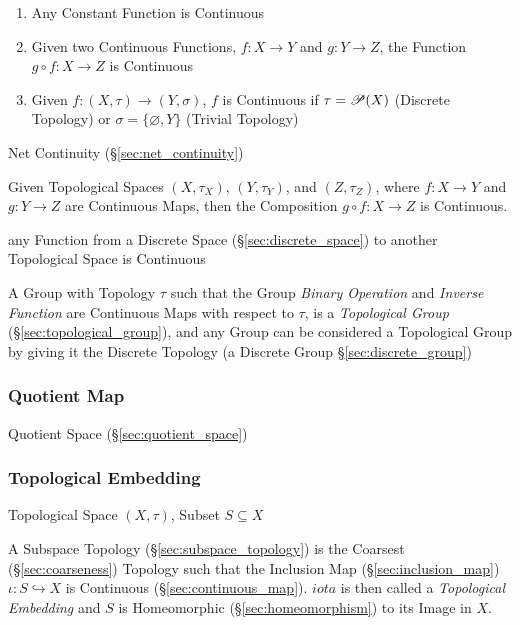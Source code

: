 \begin{enumerate}
  \item Any Constant Function is Continuous
  \item Given two Continuous Functions, $f : X \rightarrow Y$ and $g
    : Y \rightarrow Z$, the Function $g \circ f : X \rightarrow Z$ is
    Continuous
  \item Given $f : (X, \tau) \rightarrow (Y, \sigma)$, $f$ is
    Continuous if $\tau = \mathscr{P}(X)$ (Discrete Topology) or
    $\sigma = \{\varnothing, Y\}$ (Trivial Topology)
\end{enumerate}

Net Continuity (\S\ref{sec:net_continuity})

Given Topological Spaces $(X, \tau_X)$, $(Y, \tau_Y)$, and $(Z,
\tau_Z)$, where $f: X \rightarrow Y$ and $g: Y \rightarrow Z$ are
Continuous Maps, then the Composition $g \circ f : X \rightarrow Z$ is
Continuous.

any Function from a Discrete Space (\S\ref{sec:discrete_space}) to another
Topological Space is Continuous

A Group with Topology $\tau$ such that the Group \emph{Binary Operation} and
\emph{Inverse Function} are Continuous Maps with respect to $\tau$, is a
\emph{Topological Group} (\S\ref{sec:topological_group}), and any Group can be
considered a Topological Group by giving it the Discrete Topology (a Discrete
Group \S\ref{sec:discrete_group})



\subsubsection{Quotient Map}\label{sec:quotient_map}

Quotient Space (\S\ref{sec:quotient_space})



\subsubsection{Topological Embedding}\label{sec:topological_embedding}

Topological Space $(X,\tau)$, Subset $S \subseteq X$

A Subspace Topology (\S\ref{sec:subspace_topology}) is the Coarsest
(\S\ref{sec:coarseness}) Topology such that the Inclusion Map
(\S\ref{sec:inclusion_map}) $\iota : S \hookrightarrow X$ is
Continuous (\S\ref{sec:continuous_map}). $iota$ is then called a
\emph{Topological Embedding} and $S$ is Homeomorphic
(\S\ref{sec:homeomorphism}) to its Image in $X$.

